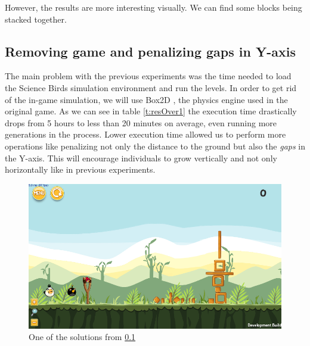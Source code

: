 \documentclass[sigconf]{acmart}
\begin{document}
However, the results are more interesting visually. We can find some blocks 
being stacked together.


\subsection{Removing game and penalizing gaps in Y-axis}\label{E5}

The main problem with the previous experiments was the time needed to
load the Science Birds simulation environment and run the levels.
In order to get rid of the in-game simulation, we will use Box2D
\cite{catto2011box2d}\cite{box2d}, the physics engine used in the original game.
As we can see in table \ref{t:resOver1} the execution time drastically
drops from 5 hours to less than 20 minutes on average, even running
more generations in the process.
Lower execution time allowed us to perform more operations like penalizing
not only the distance to the ground but also the \textit{gaps} in the
Y-axis.
This will encourage individuals to grow vertically and not only horizontally
like in previous experiments.
%
 \begin{figure}
 	\centering
 	\includegraphics[scale=0.3]{E5.png}
 	\caption{One of the solutions from \ref{E5}}\label{f:e5}
      \end{figure}
\end{document}

